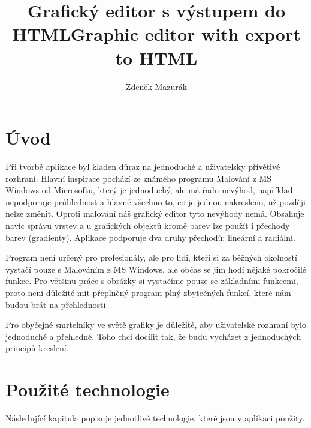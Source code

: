 \documentclass[
  field=inf,
  biblatex=false,
  glossaries,
  index
]{kidiplom}
\title{Grafický editor s výstupem do HTML}
\title[english]{Graphic editor with export to HTML}
\subtitle{}
\subtitle[english]{}
\author{Zdeněk Mazurák}
\begin{document}
\maketitle



\newcommand{\BibLaTeX}{\textsc{Bib}\LaTeX}

\section{Úvod}

Při tvorbě aplikace byl kladen důraz na jednoduché a uživatelsky přívětivé rozhraní. Hlavní inspirace pochází ze známého programu Malování z MS Windows od Microsoftu, který je jednoduchý, ale má řadu nevýhod, například nepodporuje průhlednost a hlavně všechno to, co je jednou nakresleno, už později nelze změnit. Oproti malování náš grafický editor tyto nevýhody nemá. Obsahuje navíc správu vrstev a u grafických objektů kromě barev lze použít i přechody barev (gradienty). Aplikace podporuje dva druhy přechodů: lineární a radiální.

Program není určený pro profesionály, ale pro lidi, kteří si za běžných okolností vystačí pouze s Malováním z MS Windows, ale občas se jim hodí nějaké pokročilé funkce. Pro většinu práce s obrázky si vystačíme pouze se základními funkcemi, proto není důležité mít přeplněný program plný zbytečných funkcí, které nám budou brát na přehlednosti.

Pro obyčejné smrtelníky ve světě grafiky je důležité, aby uživatelské rozhraní bylo jednoduché a přehledné. Toho chci docílit tak, že budu vycházet z jednoduchých principů kreslení.

\newpage

\section{Použité technologie}

Následující kapitula popisuje jednotlivé technologie, které jsou v aplikaci použity.
\end{document}
